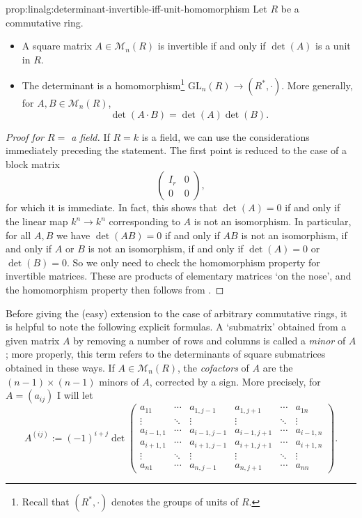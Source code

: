 \begin{prop}{}{prop:linalg:determinant-invertible-iff-unit-homomorphism}
  Let $R$ be a commutative ring.
  \begin{itemize}
  \item A square matrix $A \in \mathcal{M}_n(R)$ is invertible if and
    only if $\det(A)$ is a unit in $R$.
  \item The determinant is a homomorphism\footnote{Recall that
      $(R^*, \cdot)$ denotes the groups of units of $R$.}
    $\mathrm{GL}_n(R) \to (R^*, \cdot)$. More generally, for
    $A, B \in \mathcal{M}_n(R)$,
    \[
      \det(A \cdot B) = \det(A) \det(B).
    \]
  \end{itemize}
\end{prop}
\begin{proof}[Proof for $R = $ a field]
  If $R = k$ is a field, we can use the considerations immediately
  preceding the statement. The first point is reduced to the case of a
  block matrix
  \[
    \left(
      \begin{array}{c|c}
        I_r & 0 \\
        \hline
        0 & 0
      \end{array}
    \right),
  \]
  for which it is immediate. In fact, this shows that $\det(A) = 0$ if
  and only if the linear map $k^n \to k^n$ corresponding to $A$ is not
  an isomorphism. In particular, for all $A, B$ we have $\det(AB) = 0$
  if and only if $AB$ is not an isomorphism, if and only if $A$ or $B$
  is not an isomorphism, if and only if $\det(A) = 0$ or
  $\det(B) = 0$. So we only need to check the homomorphism property
  for invertible matrices.  These are products of elementary matrices
  `on the nose', and the homomorphism property then follows from
  .
\end{proof}

Before giving the (easy) extension to the case of arbitrary
commutative rings, it is helpful to note the following explicit
formulas. A `submatrix' obtained from a given matrix $A$ by removing a
number of rows and columns is called a \emph{minor} of $A$; more
properly, this term refers to the determinants of square submatrices
obtained in these ways. If $A \in \mathcal{M}_n(R)$, the
\emph{cofactors} of $A$ are the $(n-1) \times (n-1)$ minors of $A$,
corrected by a sign. More precisely, for $A = (a_{ij})$ I will let
\[
  A^{(ij)} := (-1)^{i+j} \det
  \begin{pmatrix}
    a_{11} & \cdots & a_{1,j-1} & a_{1,j+1} & \cdots & a_{1n} \\
    \vdots & \ddots & \vdots & \vdots & \ddots & \vdots \\
    a_{i-1,1} & \cdots & a_{i-1,j-1} & a_{i-1,j+1} & \cdots & a_{i-1,n} \\
    a_{i+1,1} & \cdots & a_{i+1,j-1} & a_{i+1,j+1} & \cdots & a_{i+1,n} \\
    \vdots & \ddots & \vdots & \vdots & \ddots & \vdots \\
    a_{n1} & \cdots & a_{n,j-1} & a_{n,j+1} & \cdots & a_{nn}
  \end{pmatrix}.
\]


